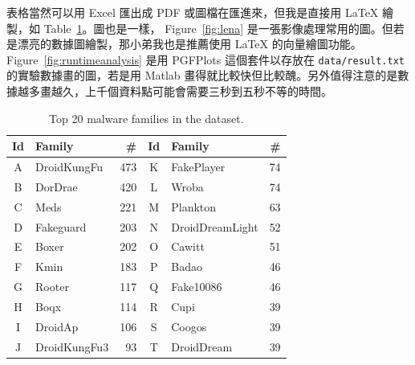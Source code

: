 表格當然可以用 Excel 匯出成 PDF 或圖檔在匯進來，但我是直接用 LaTeX 繪製，如 Table~\ref{tab:sample1}。圖也是一樣， Figure~\ref{fig:lena} 是一張影像處理常用的圖。但若是漂亮的數據圖繪製，那小弟我也是推薦使用 LaTeX 的向量繪圖功能。 Figure~\ref{fig:runtimeanalysis} 是用 PGFPlots 這個套件以存放在 \texttt{data/result.txt} 的實驗數據畫的圖，若是用 Matlab 畫得就比較快但比較醜。另外值得注意的是數據越多畫越久，上千個資料點可能會需要三秒到五秒不等的時間。

\begin{table}
\centering
\begin{tabular}{clr|clr}
  \toprule
    \textbf{Id} & \textbf{Family} & \textbf{\#} & \textbf{Id} & \textbf{Family} & \textbf{\#} \\
  \midrule
  A & DroidKungFu   & 473 & K & FakePlayer      &  74 \\
  B & DorDrae       & 420 & L & Wroba           &  74 \\
  C & Meds          & 221 & M & Plankton        &  63 \\
  D & Fakeguard     & 203 & N & DroidDreamLight &  52 \\
  E & Boxer         & 202 & O & Cawitt          &  51 \\
  F & Kmin          & 183 & P & Badao           &  46 \\
  G & Rooter        & 117 & Q & Fake10086       &  46 \\
  H & Boqx          & 114 & R & Cupi            &  39 \\
  I & DroidAp       & 106 & S & Coogos          &  39 \\
  J & DroidKungFu3  &  93 & T & DroidDream      &  39 \\
  \bottomrule
\end{tabular}
\caption{Top 20 malware families in the dataset.}
\label{tab:sample1}
\end{table}

